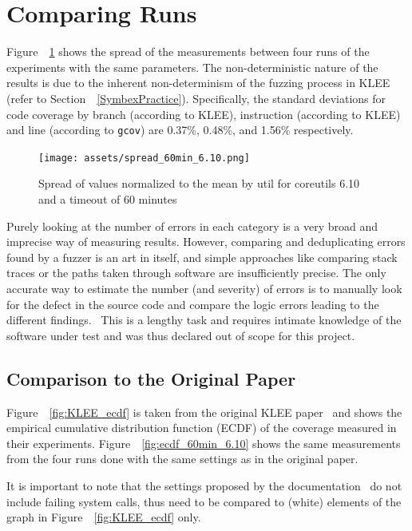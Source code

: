 \documentclass{article}
\let\savedCite=\cite
\renewcommand{\cite}{\unskip~\savedCite}
\let\savedRef=\ref
\renewcommand{\ref}{\unskip~\savedRef}
\begin{document}
\section{Comparing Runs}
\label{Timeouts}

Figure~\ref{fig:spread_60min_6.10} shows the spread of the measurements between four runs of the experiments with the same parameters. The non-deterministic nature of the results is due to the inherent non-determinism of the fuzzing process in KLEE (refer to Section~\ref{SymbexPractice}). Specifically, the standard deviations for code coverage by branch (according to KLEE), instruction (according to KLEE) and line (according to \lstinline{gcov}) are 0.37\%, 0.48\%, and 1.56\% respectively.

\begin{figure}[hb]
    \centering
    \texttt{[image: assets/spread\_60min\_6.10.png]}
    \caption{Spread of values normalized to the mean by util for coreutils 6.10 and a timeout of 60 minutes}
    \label{fig:spread_60min_6.10}
\end{figure}

Purely looking at the number of errors in each category is a very broad and imprecise way of measuring results. However, comparing and deduplicating errors found by a fuzzer is an art in itself, and simple approaches like comparing stack traces or the paths taken through software are insufficiently precise. The only accurate way to estimate the number (and severity) of errors is to manually look for the defect in the source code and compare the logic errors leading to the different findings.\cite{EvaluatingFuzzTesting} This is a lengthy task and requires intimate knowledge of the software under test and was thus declared out of scope for this project.

\subsection{Comparison to the Original Paper}

Figure~\ref{fig:KLEE_ecdf} is taken from the original KLEE paper\cite{KLEE} and shows the empirical cumulative distribution function (ECDF) of the coverage measured in their experiments. Figure~\ref{fig:ecdf_60min_6.10} shows the same measurements from the four runs done with the same settings as in the original paper.

It is important to note that the settings proposed by the documentation\cite{KLEEFAQ} do not include failing system calls, thus need to be compared to  (white) elements of the graph in Figure~\ref{fig:KLEE_ecdf} only.
\end{document}
